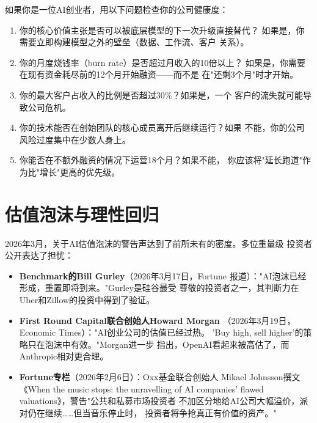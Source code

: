 \begin{warnbox}[AI创业公司存活检查清单（2026年版）]
如果你是一位AI创业者，用以下问题检查你的公司健康度：
\begin{enumerate}
  \item 你的核心价值主张是否可以被底层模型的下一次升级直接替代？
    如果是，你需要立即构建模型之外的壁垒（数据、工作流、客户
    关系）。
  \item 你的月度烧钱率（burn rate）是否超过月收入的10倍以上？
    如果是，你需要在现有资金耗尽前的12个月开始融资——而不是
    在"还剩3个月"时才开始。
  \item 你的最大客户占收入的比例是否超过30\%？如果是，一个
    客户的流失就可能导致公司危机。
  \item 你的技术能否在创始团队的核心成员离开后继续运行？如果
    不能，你的公司风险过度集中在少数人身上。
  \item 你能否在不额外融资的情况下运营18个月？如果不能，
    你应该将"延长跑道"作为比"增长"更高的优先级。
\end{enumerate}
\end{warnbox}


\section{估值泡沫与理性回归}
\label{sec:fund-bubbles}

2026年3月，关于AI估值泡沫的警告声达到了前所未有的密度。多位重量级
投资者公开表达了担忧：

\begin{itemize}
  \item \textbf{Benchmark的Bill Gurley}（2026年3月17日，Fortune
    报道）："AI泡沫已经形成，重置即将到来。"Gurley是硅谷最受
    尊敬的投资者之一，其判断力在Uber和Zillow的投资中得到了验证。
  \item \textbf{First Round Capital联合创始人Howard Morgan}
    （2026年3月19日，Economic Times）："AI创业公司的估值已经过热。
    'Buy high, sell higher'的策略只在泡沫中有效。"Morgan进一步
    指出，OpenAI看起来被高估了，而Anthropic相对更合理。
  \item \textbf{Fortune专栏}（2026年2月6日）：Oxx基金联合创始人
    Mikael Johnsson撰文《When the music stops: the unravelling of
    AI companies' flawed valuations》，警告"公共和私募市场投资者
    不加区分地给AI公司大幅溢价，派对仍在继续……但当音乐停止时，
    投资者将争抢真正有价值的资产。"
\end{itemize}

